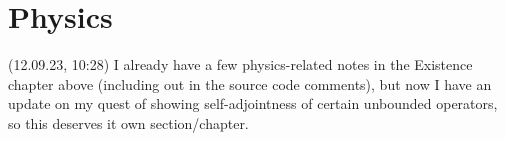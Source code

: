 \documentclass{report}
\begin{document}








\chapter{Physics}

(12.09.23, 10:28) I already have a few physics-related notes in the Existence chapter above (including out in the source code comments), but now I have an update on my quest of showing self-adjointness of certain unbounded operators, so this deserves it own section/chapter.
\end{document}
